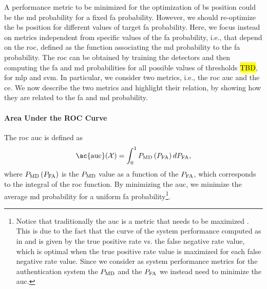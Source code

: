 \documentclass[twocolumns]{IEEEtran}
\begin{document}
A performance metric to be minimized for the optimization of \ac{bs} position could be the \ac{md} probability for a fixed \ac{fa} probability. However, we should re-optimize the \ac{bs} position for different values of target \ac{fa} probability. Here, we focus instead on metrics independent from specific values of the \ac{fa} probability, i.e., that depend on the \ac{roc}, defined as the  function associating the \ac{md} probability to the \ac{fa} probability. The \ac{roc} can be obtained by training the detectors and then computing the \ac{fa} and \ac{md} probabilities for all possible values of thresholds \hl{TBD}, for \ac{mlp} and \ac{svm}. In particular, we consider two metrics, i.e., the   \ac{roc} \ac{auc} \cite{hanley-82} and the  \ac{ce}. We now describe the two metrics and highlight their relation, by showing how they  are related to the \ac{fa} and \ac{md} probability.

\paragraph{Area Under the ROC Curve} The \ac{roc} \ac{auc} is defined as 
\begin{equation}
    \text{\ac{auc}}(\mathcal{X}) = \int_{0}^{1} P_{\rm MD}\left(P_{\rm FA}\right) d P_{\rm FA},
\end{equation}
where $P_{\rm MD}\left(P_{\rm FA}\right)$ is the $P_{\rm MD}$ value as a function of the $P_{\rm FA}$, which corresponds to the integral of the \ac{roc} function. By minimizing the \ac{auc}, we minimize the average \ac{md} probability for a uniform \ac{fa} probability\footnote{Notice that traditionally the \ac{auc} is a metric that needs to be maximized \cite{hanley-82}. This is due to the fact that the curve of the system performance computed as in \cite{hanley-82} and \cite{Kennedy-11} is given by the true positive rate vs. the false negative rate value, which is optimal when the true positive rate value is maximized for each false negative rate value. Since we consider as system performance metrics for the authentication system the $P_{\rm MD}$ and the $P_{\rm FA}$ we instead need to minimize the \ac{auc}.}. 
\end{document}

